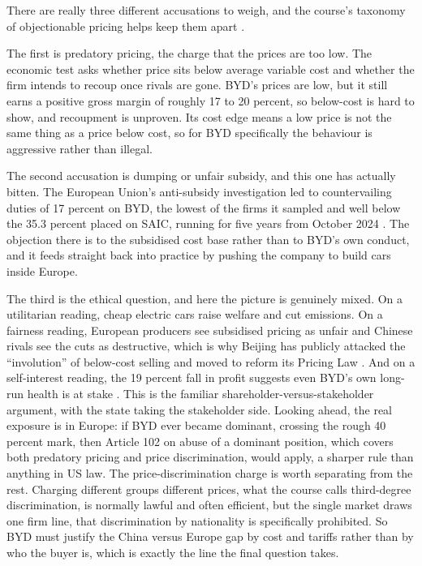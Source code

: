 
There are really three different accusations to weigh, and the course's taxonomy of objectionable pricing helps keep them apart \cite{nagle2018}.

The first is predatory pricing, the charge that the prices are too low. The economic test asks whether price sits below average variable cost and whether the firm intends to recoup once rivals are gone. BYD's prices are low, but it still earns a positive gross margin of roughly 17 to 20 percent, so below-cost is hard to show, and recoupment is unproven. Its cost edge means a low price is not the same thing as a price below cost, so for BYD specifically the behaviour is aggressive rather than illegal.

The second accusation is dumping or unfair subsidy, and this one has actually bitten. The European Union's anti-subsidy investigation led to countervailing duties of 17 percent on BYD, the lowest of the firms it sampled and well below the 35.3 percent placed on SAIC, running for five years from October 2024 \cite{ec2024}. The objection there is to the subsidised cost base rather than to BYD's own conduct, and it feeds straight back into practice by pushing the company to build cars inside Europe.

The third is the ethical question, and here the picture is genuinely mixed. On a utilitarian reading, cheap electric cars raise welfare and cut emissions. On a fairness reading, European producers see subsidised pricing as unfair and Chinese rivals see the cuts as destructive, which is why Beijing has publicly attacked the ``involution'' of below-cost selling and moved to reform its Pricing Law \cite{cnbcInvolution}. And on a self-interest reading, the 19 percent fall in profit suggests even BYD's own long-run health is at stake \cite{byd2025}. This is the familiar shareholder-versus-stakeholder argument, with the state taking the stakeholder side. Looking ahead, the real exposure is in Europe: if BYD ever became dominant, crossing the rough 40 percent mark, then Article 102 on abuse of a dominant position, which covers both predatory pricing and price discrimination, would apply, a sharper rule than anything in US law. The price-discrimination charge is worth separating from the rest. Charging different groups different prices, what the course calls third-degree discrimination, is normally lawful and often efficient, but the single market draws one firm line, that discrimination by nationality is specifically prohibited. So BYD must justify the China versus Europe gap by cost and tariffs rather than by who the buyer is, which is exactly the line the final question takes.
